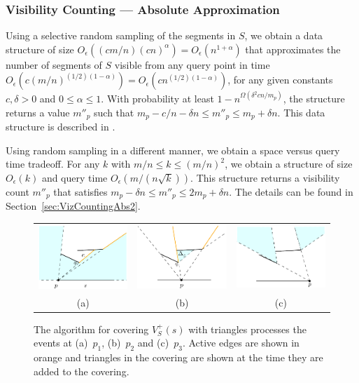 \documentclass{patmorin}
\newcommand{\Oe}{O_\epsilon}
\begin{document}
\subsubsection{Visibility Counting --- Absolute Approximation}

Using a selective random sampling of the segments in $S$, we obtain a data
structure of size $\Oe((cm/n)(cn)^\alpha)=\Oe(n^{1+\alpha})$
that approximates the number of segments of $S$ visible from any query point in
time $\Oe(c(m/n)^{(1/2)(1-\alpha)})=\Oe(cn^{(1/2)(1-\alpha)})$,
for any given constants $c, \delta >0$ and $0\leq \alpha \leq 1$.
With probability at least $1-n^{\Omega(\delta^2 cn/m_p)}$, the structure returns
a value $m''_p$ such that $m_p - c/n-\delta n \le m''_p\le m_p+\delta n$.
This data structure is described in .

Using random sampling in a different manner, we obtain a space versus query
time tradeoff. For any $k$ with $m/n \le k \le (m/n)^2$, we obtain a
structure of size $\Oe(k)$ and query time $\Oe(m/(n{\sqrt k}))$.  This
structure returns a visibility count $m''_p$ that satisfies $m_p-\delta n
\le m''_p \le 2m_p + \delta n$. The details can be found in Section~\ref{sec:VizCountingAbs2}.

\begin{figure} [tbh]
  \begin{center}
    \begin{tabular}{ccc}
      \includegraphics[width=4cm]{alg-1} &
      \includegraphics[width=4cm]{alg-2} &
      \includegraphics[width=4cm]{alg-3} \\
      (a) & (b) & (c)
    \end{tabular}
  \end{center}
  \caption{The algorithm for covering $V^+_S(s)$ with triangles processes
           the events at (a)~$p_1$, (b)~$p_2$ and (c)~$p_3$.
           Active edges are shown in orange and triangles in the covering
           are shown at the time they are added to the covering.}
\end{figure}
\end{document}
